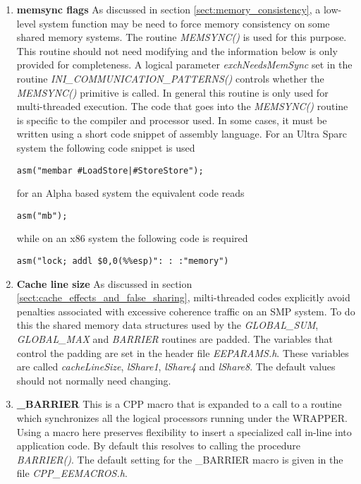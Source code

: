 \begin{enumerate}
\item {\bf memsync flags}
  As discussed in section \ref{sect:memory_consistency}, a low-level
  system function may be need to force memory consistency on some
  shared memory systems.  The routine {\em MEMSYNC()} is used for this
  purpose. This routine should not need modifying and the information
  below is only provided for completeness. A logical parameter {\em
    exchNeedsMemSync} set in the routine {\em
    INI\_COMMUNICATION\_PATTERNS()} controls whether the {\em
    MEMSYNC()} primitive is called. In general this routine is only
  used for multi-threaded execution.  The code that goes into the {\em
    MEMSYNC()} routine is specific to the compiler and processor used.
  In some cases, it must be written using a short code snippet of
  assembly language.  For an Ultra Sparc system the following code
  snippet is used
\begin{verbatim}
asm("membar #LoadStore|#StoreStore");
\end{verbatim}
for an Alpha based system the equivalent code reads
\begin{verbatim}
asm("mb");
\end{verbatim}
while on an x86 system the following code is required
\begin{verbatim}
asm("lock; addl $0,0(%%esp)": : :"memory")
\end{verbatim}

\item {\bf Cache line size}
  As discussed in section \ref{sect:cache_effects_and_false_sharing},
  milti-threaded codes explicitly avoid penalties associated with
  excessive coherence traffic on an SMP system. To do this the shared
  memory data structures used by the {\em GLOBAL\_SUM}, {\em
    GLOBAL\_MAX} and {\em BARRIER} routines are padded. The variables
  that control the padding are set in the header file {\em
    EEPARAMS.h}. These variables are called {\em cacheLineSize}, {\em
    lShare1}, {\em lShare4} and {\em lShare8}. The default values
  should not normally need changing.

\item {\bf \_BARRIER}
  This is a CPP macro that is expanded to a call to a routine which
  synchronizes all the logical processors running under the WRAPPER.
  Using a macro here preserves flexibility to insert a specialized
  call in-line into application code. By default this resolves to
  calling the procedure {\em BARRIER()}. The default setting for the
  \_BARRIER macro is given in the file {\em CPP\_EEMACROS.h}.


\end{enumerate}
